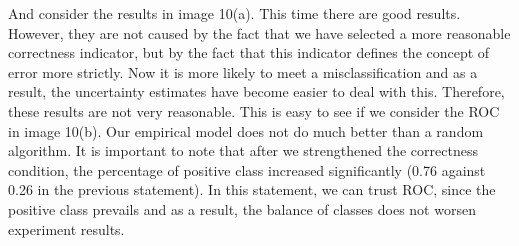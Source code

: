 \documentclass[a4paper,14pt]{extarticle}
\begin{document}
	And consider the results in image 10(a). This time there are good results. However, they are not caused by the fact that we have selected a more reasonable correctness indicator, but by the fact that this indicator defines the concept of error more strictly. Now it is more likely to meet a misclassification and as a result, the uncertainty estimates have become easier to deal with this. Therefore, these results are not very reasonable. This is easy to see if we consider the ROC in image 10(b). Our empirical model does not do much better than a random algorithm. It is important to note that after we strengthened the correctness condition, the percentage of positive class increased significantly (0.76 against 0.26 in the previous statement). In this statement, we can trust ROC, since the positive class prevails and as a result, the balance of classes does not worsen experiment results.
	
\end{document}
